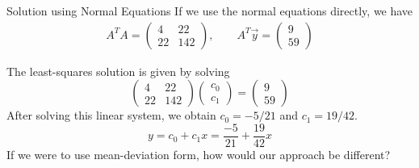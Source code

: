 \begin{frame}{Solution using Normal Equations}
    If we use the normal equations directly, we have 
    \begin{align*}
    A ^{T} A = \begin{pmatrix} 4 & 22 \\ 22 & 142 \end{pmatrix} , \qquad 
    A ^{T} \vec y = \begin{pmatrix} 9 \\ 59 \end{pmatrix}
    \end{align*}
    
    The least-squares solution is given by solving
    \begin{equation*}
    \begin{pmatrix}4 &22 \\  22 & 142 \end{pmatrix} \begin{pmatrix} c_0 \\ c_1 \end{pmatrix} = \begin{pmatrix} 9 \\ 59 \end{pmatrix}
    \end{equation*}
    \pause 
    After solving this linear system, we obtain $c_0 = -5/21$ and $c_1 = 19/42$. 
    \begin{equation*}
        y = c _0 + c _1 x = \frac{-5}{21} + \frac{19}{42} x 
    \end{equation*}
    \pause 
    If we were to use mean-deviation form, how would our approach be different? 
\end{frame}


